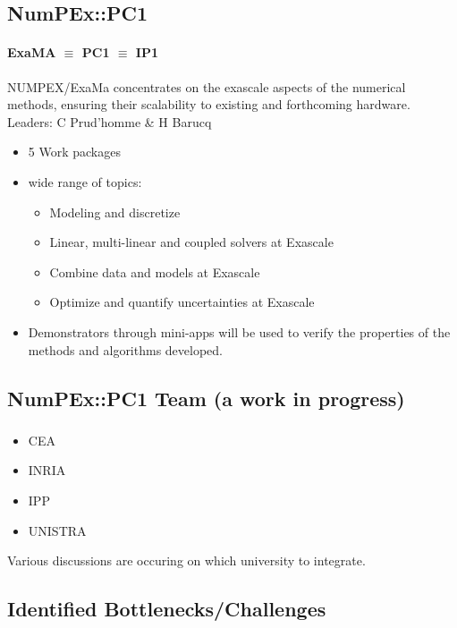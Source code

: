 \subsection{NumPEx::PC1}
\begin{frame}{\insertsectionhead}
  \framesubtitle{ExaMA $\equiv$ PC1 $\equiv$ IP1}
  NUMPEX/ExaMa concentrates on the exascale aspects of the numerical methods, ensuring their scalability to existing and forthcoming hardware.
  \vfill
  Leaders: C Prud'homme \& H Barucq
  \begin{itemize}
    \item 5 Work packages
    \item wide range of topics: 
    \begin{itemize}
        \item Modeling and discretize
        \item Linear, multi-linear and coupled solvers at Exascale
        \item Combine data and  models at Exascale
        \item Optimize and quantify uncertainties at Exascale
    \end{itemize}
    \item Demonstrators through mini-apps will be used to verify the properties of the methods and algorithms developed.
  \end{itemize}
\end{frame}

\subsection{NumPEx::PC1 Team (a work in progress)}

\begin{frame}
  \frametitle{\insertsectionhead}
  \framesubtitle{\insertsubsectionhead}

  \begin{itemize}
    \item CEA 
    \item INRIA 
    \item IPP
    \item UNISTRA 
  \end{itemize}

  \alert{Various discussions are occuring on which university to integrate.}
\end{frame}



\subsection{Identified Bottlenecks/Challenges}

